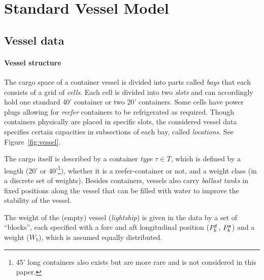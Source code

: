 


\section{Standard Vessel Model}

\subsection*{Vessel data}
\paragraph{Vessel structure}
The cargo space of a container vessel is divided into parts called \textit{bays} that each consists of a grid of \emph{cells}. Each cell is divided into two \emph{slots} and can accordingly hold one standard 40' container or two 20' containers. Some cells have power plugs allowing for \emph{reefer} containers to be refrigerated as required. Though containers physically are placed in specific slots, the considered vessel data specifies certain capacities in subsections of each bay, called \emph{locations}. See Figure~\ref{fig:vessel}. 

The cargo itself is described by a container \emph{type} $\tau \in T$, which is defined by a length (20' or 40'\footnote{45' long containers also exists but are more rare and is not considered in this paper.}), whether it is a reefer-container or not, and a weight class (in a discrete set of weights). 
Besides containers, vessels also carry \emph{ballast tanks} in fixed positions along the vessel that can be filled with water to improve the stability of the vessel.

The weight of the (empty) vessel (\emph{lightship}) is given in the data by a set of ``blocks'', each specified with a fore and aft longitudinal position ($P^{\texttt{f}}_b$, $P^{\texttt{a}}_b$) and a weight ($W_b$), which is assumed equally distributed. 

